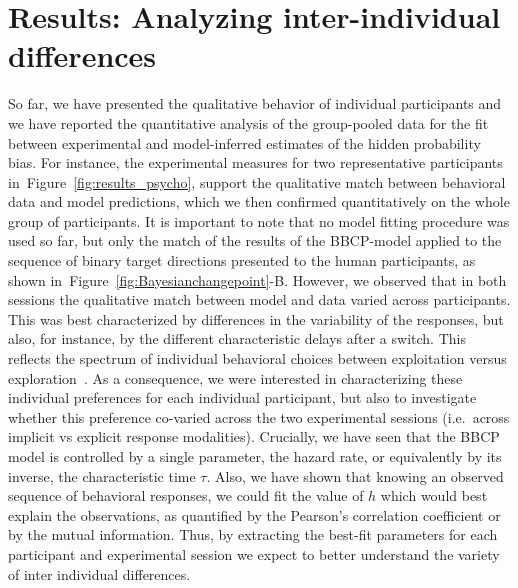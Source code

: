 \documentclass[10pt,letterpaper]{article}
\newcommand{\citep}[1]{\cite{#1}}
\newcommand{\seeFig}[1]{Figure~\ref{fig:#1}}
\begin{document}
\section{Results: Analyzing inter-individual differences}
\label{sec:inter}
So far, we have presented the qualitative behavior of individual participants and
we have reported the quantitative analysis of the group-pooled data
for the fit between experimental and model-inferred estimates of the hidden probability bias.
For instance, the experimental measures for two representative participants in~\seeFig{results_psycho},
support the qualitative match between behavioral data and model predictions,
which we then confirmed quantitatively on the whole group of participants.
It is important to note that no model fitting procedure was used so far,
but only the match of the results of the BBCP-model
applied to the sequence of binary target directions
presented to the human participants,
as shown in~\seeFig{Bayesianchangepoint}-B.
However, we observed that in both sessions the qualitative match between model and data varied across participants.
This was best characterized by differences
in the variability of the responses, but also, for instance,
by the different characteristic delays after a switch.
This reflects the spectrum of individual behavioral choices
between exploitation versus exploration~\citep{Behrens07}.
As a consequence, we were interested in characterizing these individual preferences
for each individual participant,
but also to investigate whether this preference co-varied
across the two experimental sessions (i.e.~across implicit vs explicit response modalities).
Crucially, we have seen that the BBCP model is controlled by a single parameter,
the hazard rate, or equivalently by its inverse, the characteristic time $\tau$.
Also, we have shown that knowing an observed sequence of behavioral responses,
we could fit the value of $h$ which would best explain the observations,
as quantified by the Pearson's correlation coefficient or by the mutual information.
Thus, by extracting the best-fit parameters for each participant and experimental session
we expect to better understand the variety of inter individual differences. %
\end{document}
